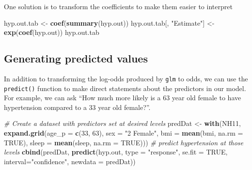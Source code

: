 \documentclass[]{book}
\newenvironment{Shaded}{\begin{snugshade}}{\end{snugshade}}
\newcommand{\KeywordTok}[1]{\textcolor[rgb]{0.13,0.29,0.53}{\textbf{#1}}}
\newcommand{\DataTypeTok}[1]{\textcolor[rgb]{0.13,0.29,0.53}{#1}}
\newcommand{\DecValTok}[1]{\textcolor[rgb]{0.00,0.00,0.81}{#1}}
\newcommand{\StringTok}[1]{\textcolor[rgb]{0.31,0.60,0.02}{#1}}
\newcommand{\CommentTok}[1]{\textcolor[rgb]{0.56,0.35,0.01}{\textit{#1}}}
\newcommand{\OtherTok}[1]{\textcolor[rgb]{0.56,0.35,0.01}{#1}}
\newcommand{\NormalTok}[1]{#1}
\begin{document}
One solution is to transform the coefficients to make them easier to
interpret

\begin{Shaded}
\begin{Highlighting}[]
\NormalTok{  hyp.out.tab <-}\StringTok{ }\KeywordTok{coef}\NormalTok{(}\KeywordTok{summary}\NormalTok{(hyp.out))}
\NormalTok{  hyp.out.tab[, }\StringTok{"Estimate"}\NormalTok{] <-}\StringTok{ }\KeywordTok{exp}\NormalTok{(}\KeywordTok{coef}\NormalTok{(hyp.out))}
\NormalTok{  hyp.out.tab}
\end{Highlighting}
\end{Shaded}

\subsection{Generating predicted
values}\label{generating-predicted-values}

In addition to transforming the log-odds produced by \texttt{glm} to
odds, we can use the \texttt{predict()} function to make direct
statements about the predictors in our model. For example, we can ask
``How much more likely is a 63 year old female to have hypertension
compared to a 33 year old female?''.

\begin{Shaded}
\begin{Highlighting}[]
  \CommentTok{# Create a dataset with predictors set at desired levels}
\NormalTok{  predDat <-}\StringTok{ }\KeywordTok{with}\NormalTok{(NH11,}
                  \KeywordTok{expand.grid}\NormalTok{(}\DataTypeTok{age_p =} \KeywordTok{c}\NormalTok{(}\DecValTok{33}\NormalTok{, }\DecValTok{63}\NormalTok{),}
                              \DataTypeTok{sex =} \StringTok{"2 Female"}\NormalTok{,}
                              \DataTypeTok{bmi =} \KeywordTok{mean}\NormalTok{(bmi, }\DataTypeTok{na.rm =} \OtherTok{TRUE}\NormalTok{),}
                              \DataTypeTok{sleep =} \KeywordTok{mean}\NormalTok{(sleep, }\DataTypeTok{na.rm =} \OtherTok{TRUE}\NormalTok{)))}
  \CommentTok{# predict hypertension at those levels}
  \KeywordTok{cbind}\NormalTok{(predDat, }\KeywordTok{predict}\NormalTok{(hyp.out, }\DataTypeTok{type =} \StringTok{"response"}\NormalTok{,}
                         \DataTypeTok{se.fit =} \OtherTok{TRUE}\NormalTok{, }\DataTypeTok{interval=}\StringTok{"confidence"}\NormalTok{,}
                         \DataTypeTok{newdata =}\NormalTok{ predDat))}
\end{Highlighting}
\end{Shaded}
\end{document}
